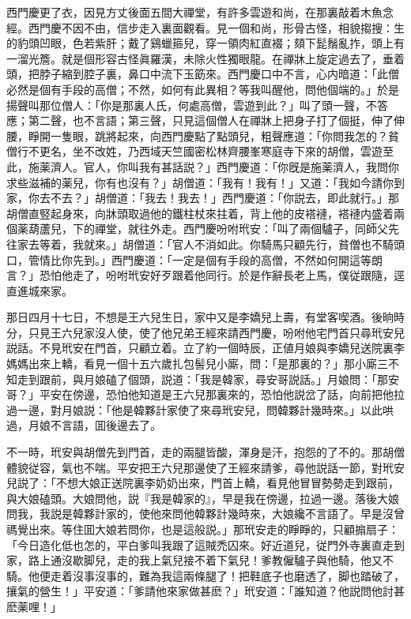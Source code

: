 西門慶更了衣，因見方丈後面五間大禪堂，有許多雲遊和尚，在那裏敲着木魚念經。西門慶不因不由，信步走入裏面觀看。見一個和尚，形骨古怪，相貌搊搜：生的豹頭凹眼，色若紫肝；戴了鷄蠟箍兒，穿一領肉紅直裰；頦下髭鬚亂拃，頭上有一溜光簷。就是個形容古怪眞羅漢，未除火性獨眼龍。在禪牀上旋定過去了，垂着頭，把脖子縮到腔子裏，鼻口中流下玉筯來。西門慶口中不言，心内暗道：「此僧必然是個有手段的高僧；不然，如何有此異相？等我叫醒他，問他個端的。」於是揚聲叫那位僧人：「你是那裏人氏，何處高僧，雲遊到此？」叫了頭一聲，不答應；第二聲，也不言語；第三聲，只見這個僧人在禪牀上把身子打了個挺，伸了伸腰，睜開一隻眼，跳將起來，向西門慶點了點頭兒，粗聲應道：「你問我怎的？貧僧行不更名，坐不改姓，乃西域天竺國密松林齊腰峯寒庭寺下來的胡僧，雲遊至此，施薬濟人。官人，你叫我有甚話説？」西門慶道：「你旣是施薬濟人，我問你求些滋補的薬兒，你有也沒有？」胡僧道：「我有！我有！」又道：「我如今請你到家，你去不去？」胡僧道：「我去！我去！」西門慶道：「你説去，即此就行。」那胡僧直竪起身來，向牀頭取過他的鐵柱杖來拄着，背上他的皮褡褳，褡褳内盛着兩個薬葫蘆兒，下的禪堂，就往外走。西門慶吩咐玳安：「叫了兩個驢子，同師父先往家去等着，我就來。」胡僧道：「官人不消如此。你騎馬只顧先行，貧僧也不騎頭口，管情比你先到。」西門慶道：「一定是個有手段的高僧，不然如何開這等朗言？」恐怕他走了，吩咐玳安好歹跟着他同行。於是作辭長老上馬，僕従跟隨，逕直進城來家。

那日四月十七日，不想是王六兒生日，家中又是李嬌兒上壽，有堂客喫酒。後晌時分，只見王六兒家沒人使，使了他兄弟王經來請西門慶，吩咐他宅門首只尋玳安兒説話。不見玳安在門首，只顧立着。立了約一個時辰，正値月娘與李嬌兒送院裏李媽媽出來上轎，看見一個十五六歲扎包髻兒小廝，問：「是那裏的？」那小廝三不知走到跟前，與月娘磕了個頭，説道：「我是韓家，尋安哥説話。」月娘問：「那安哥？」平安在傍邊，恐怕他知道是王六兒那裏來的，恐怕他説岔了話，向前把他拉過一邊，對月娘説：「他是韓夥計家使了來尋玳安兒，問韓夥計幾時來。」以此哄過，月娘不言語，囬後邊去了。

不一時，玳安與胡僧先到門首，走的兩腿皆酸，渾身是汗，抱怨的了不的。那胡僧體貌従容，氣也不喘。平安把王六兒那邊使了王經來請爹，尋他説話一節，對玳安兒説了：「不想大娘正送院裏李奶奶出來，門首上轎，看見他冒冒勢勢走到跟前，與大娘磕頭。大娘問他，説『我是韓家的』，早是我在傍邊，拉過一邊。落後大娘問我，我説是韓夥計家的，使他來問他韓夥計幾時來，大娘纔不言語了。早是沒曾禡覺出來。等住囬大娘若問你，也是這般説。」那玳安走的睜睜的，只顧搧扇子：「今日造化低也怎的，平白爹叫我跟了這賊禿囚來。好近道兒，従門外寺裏直走到家，路上通沒歇脚兒，走的我上氣兒接不着下氣兒！爹教僱驢子與他騎，他又不騎。他便走着沒事沒事的，難為我這兩條腿了！把鞋底子也磨透了，脚也踏破了，攘氣的營生！」平安道：「爹請他來家做甚麽？」玳安道：「誰知道？他説問他討甚麽薬哩！」

